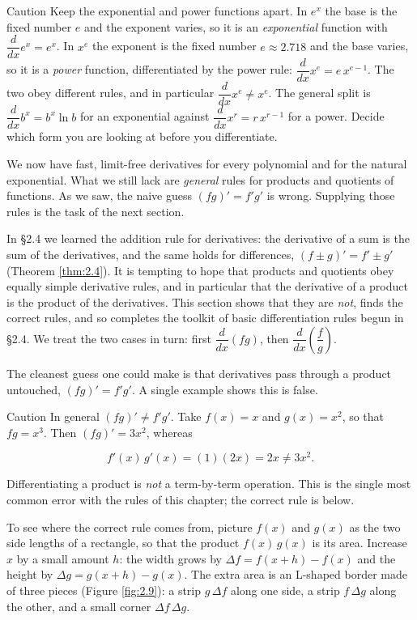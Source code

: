 \documentclass[a4paper,12pt,oneside]{memoir}
\begin{document}
\begin{envcaution}{Caution}{}{}
Keep the exponential and power functions apart. In \(e^{x}\) the base is the fixed number \(e\) and the exponent varies, so it is an \emph{exponential} function with \(\dfrac{d}{dx}e^{x} = e^{x}\). In \(x^{e}\) the exponent is the fixed number \(e \approx 2.718\) and the base varies, so it is a \emph{power} function, differentiated by the power rule: \(\dfrac{d}{dx}x^{e} = e\,x^{e-1}\). The two obey different rules, and in particular \(\dfrac{d}{dx}x^{e} \ne x^{e}\). The general split is \(\dfrac{d}{dx}b^{x} = b^{x}\ln b\) for an exponential against \(\dfrac{d}{dx}x^{r} = r\,x^{r-1}\) for a power. Decide which form you are looking at before you differentiate.
\end{envcaution}
We now have fast, limit-free derivatives for every polynomial and for the natural exponential. What we still lack are \emph{general} rules for products and quotients of functions. As we saw, the naive guess \((fg)' = f'g'\) is wrong. Supplying those rules is the task of the next section.


In §2.4 we learned the addition rule for derivatives: the derivative of a sum is the sum of the derivatives, and the same holds for differences, \((f \pm g)' = f' \pm g'\) (Theorem \ref{thm:2.4}). It is tempting to hope that products and quotients obey equally simple derivative rules, and in particular that the derivative of a product is the product of the derivatives. This section shows that they are \emph{not}, finds the correct rules, and so completes the toolkit of basic differentiation rules begun in §2.4. We treat the two cases in turn: first \(\dfrac{d}{dx}(fg)\), then \(\dfrac{d}{dx}\!\left(\dfrac{f}{g}\right)\).

The cleanest guess one could make is that derivatives pass through a product untouched, \((fg)' = f'g'\). A single example shows this is false.

\begin{envcaution}{Caution}{}{}
In general \((fg)' \ne f'g'\). Take \(f(x) = x\) and \(g(x) = x^{2}\), so that \(fg = x^{3}\). Then \((fg)' = 3x^{2}\), whereas

\[ f'(x)\,g'(x) = (1)(2x) = 2x \ne 3x^{2}. \]

Differentiating a product is \emph{not} a term-by-term operation. This is the single most common error with the rules of this chapter; the correct rule is below.
\end{envcaution}
To see where the correct rule comes from, picture \(f(x)\) and \(g(x)\) as the two side lengths of a rectangle, so that the product \(f(x)\,g(x)\) is its area. Increase \(x\) by a small amount \(h\): the width grows by \(\Delta f = f(x+h) - f(x)\) and the height by \(\Delta g = g(x+h) - g(x)\). The extra area is an L-shaped border made of three pieces (Figure \ref{fig:2.9}): a strip \(g\,\Delta f\) along one side, a strip \(f\,\Delta g\) along the other, and a small corner \(\Delta f\,\Delta g\).
\end{document}
